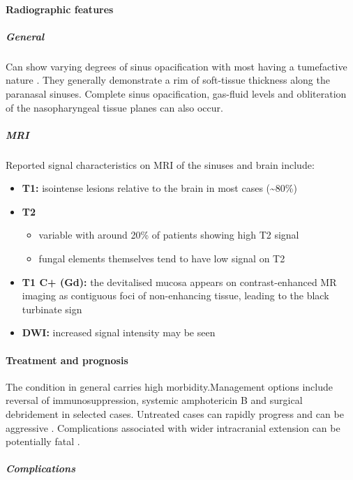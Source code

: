\paragraph{Radiographic features}

\subparagraph{General}

Can show varying degrees of sinus opacification with most having a tumefactive nature . They generally demonstrate a rim of soft-tissue thickness along the paranasal sinuses. Complete sinus opacification, gas-fluid levels and obliteration of the nasopharyngeal tissue planes can also occur.

\subparagraph{MRI}

Reported signal characteristics on MRI of the sinuses and brain include:

\begin{itemize}
	\tightlist
	\item
	\textbf{T1:} isointense lesions relative to the brain in most cases (\textasciitilde80\%) 
	\item
	\textbf{T2}
	
	\begin{itemize}
		\tightlist
		\item
		variable with around 20\% of patients showing high T2 signal 
		\item
		fungal elements themselves tend to have low signal on T2
	\end{itemize}
	\item
	\textbf{T1 C+ (Gd):} the devitalised mucosa appears on contrast-enhanced MR imaging as contiguous foci of non-enhancing tissue, leading to the black turbinate sign
	\item
	\textbf{DWI:} \textbf{} increased signal intensity may be seen 
\end{itemize}

\paragraph{Treatment and prognosis}

The condition in general carries high morbidity.Management options include reversal of immunosuppression, systemic amphotericin B and surgical debridement in selected cases. Untreated cases can rapidly progress and can be aggressive . Complications associated with wider intracranial extension can be potentially fatal .

\subparagraph{Complications}

